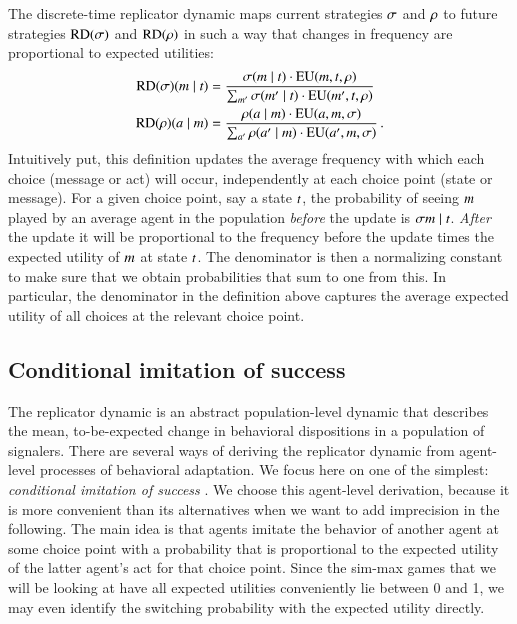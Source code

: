 \documentclass[fleqn,reqno,10pt]{article}
\newcommand{\RD}{\ensuremath{\mathrm{RD}}} %
\begin{document}
The discrete-time replicator dynamic maps current strategies $\sigma$ and $\rho$ to future
strategies $\RD(\Sstrat)$ and $\RD(\Rstrat)$ in such a way that changes in frequency are
proportional to expected utilities:
\begin{align}
  \label{eq:RDDiscrete}
  \RD(\Sstrat)(\messg \probbar \state) & = \frac{\Sstrat(\messg \probbar \state) \cdot
    \EU(\messg, \state,\Rstrat)} {\sum_{\messg'} \Sstrat(\messg' \probbar \state) \cdot
   \EU(\messg', \state,\Rstrat)} \\
    \RD(\Rstrat)(\act \probbar \messg) & = \frac{\Rstrat(\act \probbar \messg) \cdot
    \EU(\act, \messg,\Sstrat)} {\sum_{\act'} \Rstrat(\act' \probbar \messg)
    \cdot \EU(\act', \messg,\Sstrat)}  \,. \nonumber
\end{align}
Intuitively put, this definition updates the average frequency with which each choice (message
or act) will occur, independently at each choice point (state or message). For a given choice
point, say a state $t$, the probability of seeing $m$ played by an average agent in
the population \emph{before} the update is $\Sstrat{\messg \probbar \state}$. \emph{After} the
update it will be proportional to the frequency before the update times the expected utility of
$m$ at state $t$. The denominator is then a normalizing constant to make sure that we
obtain probabilities that sum to one from this. In particular, the denominator in the
definition above captures the average expected utility of all choices at the relevant choice
point.


\subsection{Conditional imitation of success}
\label{sec:cond-imit-succ}

The replicator dynamic is an abstract population-level dynamic that describes the mean,
to-be-expected change in behavioral dispositions in a population of signalers. There are
several ways of deriving the replicator dynamic from agent-level processes of behavioral
adaptation. We focus here on one of the simplest: \emph{conditional imitation of success}
\citep[see][for this and many other ways of deriving the replicator
dynamics]{Sandholm2010:Population-Game}. We choose this agent-level derivation, because it is
more convenient than its alternatives when we want to add imprecision in the following. The
main idea is that agents imitate the behavior of another agent at some choice point with a
probability that is proportional to the expected utility of the latter agent's act for that
choice point. Since the sim-max games that we will be looking at have all expected utilities
conveniently lie between 0 and 1, we may even identify the switching probability with the
expected utility directly.
\end{document}
